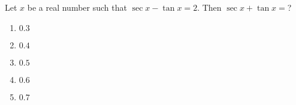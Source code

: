 Let $x$ be a real number such that $\sec x - \tan x = 2$. Then $\sec x + \tan x =$?
\begin{enumerate}
\item $0.3$
\item $0.4$
\item $0.5$
\item $0.6$
\item $0.7$
\end{enumerate}